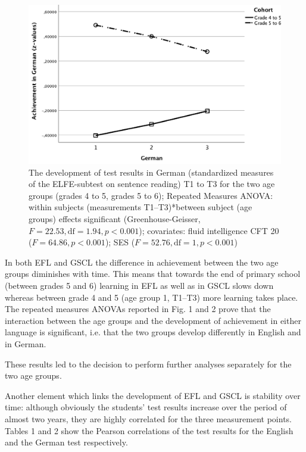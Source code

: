 \documentclass[output=paper]{langsci/langscibook}
\begin{document}
\begin{figure}
\includegraphics[width=\textwidth]{figures/figure9.2.pdf}
\caption{The development of test results in German (standardized measures of the ELFE-subtest on sentence reading) T1 to T3 for the two age groups (grades 4 to 5, grades 5 to 6); Repeated Measures ANOVA: within subjects (measurements T1–T3)*between subject (age groups) effects significant (Greenhouse-Geisser, $F=22.53, \text{df}=1.94, p<0.001$); covariates: fluid intelligence CFT 20 ($F=64.86, p<0.001$); SES ($F=52.76, \text{df}=1, p<0.001$)}
\end{figure}

In both EFL and GSCL the difference in achievement between the two age groups diminishes with time. This means that towards the end of primary school (between grades 5 and 6) learning in EFL as well as in GSCL slows down whereas between grade 4 and 5 (age group 1, T1–T3) more learning takes place. The repeated measures ANOVAs reported in Fig. 1 and 2 prove that the interaction between the age groups and the development of achievement in either language is significant, i.e. that the two groups develop differently in English and in German.

These results led to the decision to perform further analyses separately for the two age groups.

Another element which links the development of EFL and GSCL is stability over time: although obviously the students’ test results increase over the period of almost two years, they are highly correlated for the three measurement points. Tables 1 and 2 show the Pearson correlations of the test results for the English and the German test respectively.
\end{document}
